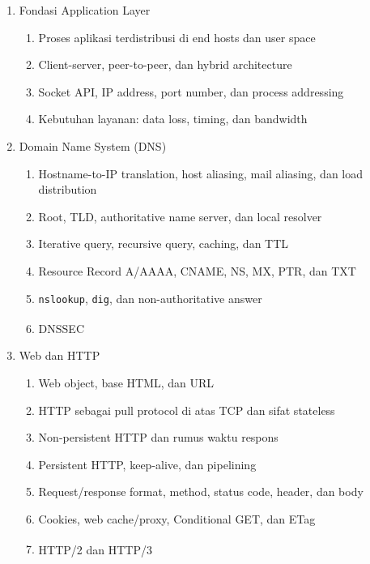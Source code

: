 \begin{enumerate}
    \item \pwajib Fondasi Application Layer
    \begin{enumerate}
        \item \pwajib Proses aplikasi terdistribusi di end hosts dan user space
        \item \pwajib Client-server, peer-to-peer, dan hybrid architecture
        \item \pwajib Socket API, IP address, port number, dan process addressing
        \item \pwajib Kebutuhan layanan: data loss, timing, dan bandwidth
    \end{enumerate}
    \item \pwajib Domain Name System (DNS)
    \begin{enumerate}
        \item \pwajib Hostname-to-IP translation, host aliasing, mail aliasing, dan load distribution
        \item \pwajib Root, TLD, authoritative name server, dan local resolver
        \item \pwajib Iterative query, recursive query, caching, dan TTL
        \item \pwajib Resource Record A/AAAA, CNAME, NS, MX, PTR, dan TXT
        \item \ppaham \texttt{nslookup}, \texttt{dig}, dan non-authoritative answer
        \item \ppaham DNSSEC\textsuperscript{\dag}
    \end{enumerate}
    \item \pwajib Web dan HTTP
    \begin{enumerate}
        \item \pwajib Web object, base HTML, dan URL
        \item \pwajib HTTP sebagai pull protocol di atas TCP dan sifat stateless
        \item \pwajib Non-persistent HTTP dan rumus waktu respons
        \item \pwajib Persistent HTTP, keep-alive, dan pipelining
        \item \pwajib Request/response format, method, status code, header, dan body
        \item \pwajib Cookies, web cache/proxy, Conditional GET, dan ETag
        \item \ppaham HTTP/2 dan HTTP/3\textsuperscript{\dag}
    \end{enumerate}

\end{enumerate}
